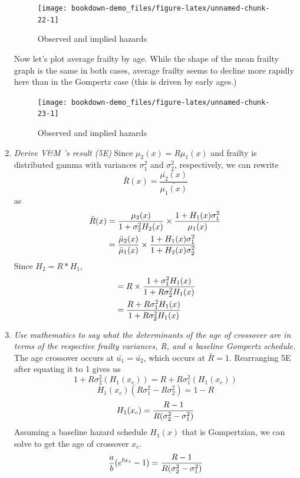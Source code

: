 \documentclass[]{book}
\begin{document}
\begin{enumerate}
  \begin{figure}
   \texttt{[image: bookdown-demo\_files/figure-latex/unnamed-chunk-22-1]} \caption{Observed and implied hazards}\label{fig:unnamed-chunk-22}
   \end{figure}

  Now let's plot average frailty by age. While the shape of the mean frailty graph is the same in both cases, average frailty seems to decline more rapidly here than in the Gompertz case (this is driven by early ages.)\\

  \begin{figure}
  \texttt{[image: bookdown-demo\_files/figure-latex/unnamed-chunk-23-1]} \caption{Observed and implied hazards}\label{fig:unnamed-chunk-23}
  \end{figure}
\item
  \emph{Derive V\&M 's result (5E)}
  Since \(\mu_2(x) = R\mu_1(x)\) and frailty is distributed gamma with variances \(\sigma_1^2\) and \(\sigma_2^2\), respectively, we can rewrite \[\bar{R}(x) = \frac{\bar{\mu_2}(x)}{\bar{\mu_1(x)}}\] as\\
  \[\begin{aligned}
  \bar{R}(x) & = {\mu_2(x) \over 1+\sigma^2_2H_2(x)} \times{1+H_1(x)\sigma^2_1 \over \mu_1(x)} \\
   & = { \bar{\mu}_2(x) \over \bar{\mu}_1(x) }\times { 1+H_1(x)\sigma^2_1 \over 1+H_2(x)\sigma^2_2 }
  \end{aligned}\]
  Since \(H_2 = R*H_1\),
  \[\begin{aligned}
   & = {R} \times { 1+\sigma^2_1 H_1(x) \over 1+R\sigma^2_2 H_1(x) }\\
   & = { R+R\sigma^2_1 H_1(x) \over 1+R\sigma^2_2 H_1(x) }
   \end{aligned}\]
\item
  \emph{Use mathematics to say what the determinants of the age of crossover are in terms of the respective frailty variances, R, and a baseline Gompertz schedule.}\\
  The age crossover occurs at \(\bar{u_1} = \bar{u_2}\), which occurs at \(\bar{R} = 1\).
  Rearranging 5E after equating it to 1 gives us
  \[1+R\sigma_2^2(H_1(x_c)) = R+R\sigma_1^2(H_1(x_c))\]
  \[H_1(x_c)(R\sigma_1^2 - R\sigma_2^2) = 1-R\]
  \[H_1(x_c) = { R -1 \over R(\sigma_2^2 - \sigma_1^2)}\]
  Assuming a baseline hazard schedule \(H_1(x)\) that is Gompertzian, we can solve to get the age of crossover \(x_c\).
  \[ \begin{aligned} 
   {a \over b}(e^{bx_c} -1) & = { R -1 \over R(\sigma_2^2 - \sigma_1^2)} \\ 

\end{aligned}\]
\end{enumerate}
\end{document}
